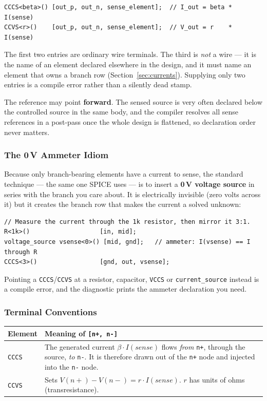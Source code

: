 \documentclass[11pt, a4paper]{article}
\newcommand{\code}[1]{\texttt{\small #1}}
\begin{document}
\begin{lstlisting}
CCCS<beta>() [out_p, out_n, sense_element];  // I_out = beta * I(sense)
CCVS<r>()    [out_p, out_n, sense_element];  // V_out = r    * I(sense)
\end{lstlisting}

The first two entries are ordinary wire terminals. The third is \textit{not} a
wire --- it is the name of an element declared elsewhere in the design, and it
must name an element that owns a branch row (Section~\ref{sec:currents}).
Supplying only two entries is a compile error rather than a silently dead
stamp.

The reference may point \textbf{forward}. The sensed source is very often
declared below the controlled source in the same body, and the compiler
resolves all sense references in a post-pass once the whole design is
flattened, so declaration order never matters.

\subsubsection{The 0\,V Ammeter Idiom}

Because only branch-bearing elements have a current to sense, the standard
technique --- the same one SPICE uses --- is to insert a \textbf{0\,V voltage
source} in series with the branch you care about. It is electrically invisible
(zero volts across it) but it creates the branch row that makes the current a
solved unknown:

\begin{lstlisting}
// Measure the current through the 1k resistor, then mirror it 3:1.
R<1k>()                   [in, mid];
voltage_source vsense<0>() [mid, gnd];   // ammeter: I(vsense) == I through R
CCCS<3>()                 [gnd, out, vsense];
\end{lstlisting}

Pointing a \code{CCCS}/\code{CCVS} at a resistor, capacitor, \code{VCCS} or
\code{current\_source} instead is a compile error, and the diagnostic prints the
ammeter declaration you need.

\subsubsection{Terminal Conventions}

\begin{center}
\begin{tabular}{@{} L{2.2cm} L{11cm} @{}}
  \toprule
  \textbf{Element} & \textbf{Meaning of \code{[n+, n-]}} \\
  \midrule
  \code{CCCS} & The generated current \(\beta \cdot I(sense)\) flows
                \textit{from} \code{n+}, through the source, \textit{to}
                \code{n-}. It is therefore drawn out of the \code{n+} node and
                injected into the \code{n-} node. \\
  \code{CCVS} & Sets \(V(n\!+\!) - V(n\!-\!) = r \cdot I(sense)\).
                \(r\) has units of ohms (transresistance). \\
  \bottomrule
\end{tabular}
\end{center}
\end{document}
